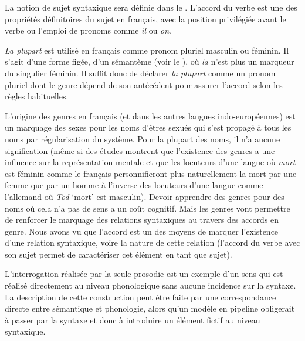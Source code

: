 {     La notion de sujet syntaxique sera définie dans le . L’accord du verbe est une des propriétés définitoires du sujet en français, avec la position privilégiée avant le verbe ou l’emploi de pronoms comme \textit{il} ou \textit{on}.

     \textit{La plupart} est utilisé en français comme pronom pluriel masculin ou féminin. Il s’agit d’une forme figée, d’un sémantème (voir le ), où \textit{la} n’est plus un marqueur du singulier féminin. Il suffit donc de déclarer \textit{la plupart} comme un pronom pluriel dont le genre dépend de son antécédent pour assurer l’accord selon les règles habituelles.

     L’origine des genres en français (et dans les autres langues indo-européennes) est un marquage des sexes pour les noms d’êtres sexués qui s’est propagé à tous les noms par régularisation du système. Pour la plupart des noms, il n’a aucune signification (même si des études montrent que l’existence des genres a une influence sur la représentation mentale et que les locuteurs d’une langue où \textit{mort} est féminin comme le français personnifieront plus naturellement la mort par une femme que par un homme à l’inverse des locuteurs d’une langue comme l’allemand où \textit{Tod} ‘mort’ est masculin). Devoir apprendre des genres pour des noms où cela n’a pas de sens a un coût cognitif. Mais les genres vont permettre de renforcer le marquage des relations syntaxiques au travers des accords en genre. Nous avons vu que l’accord est un des moyens de marquer l’existence d’une relation syntaxique, voire la nature de cette relation (l’accord du verbe avec son sujet permet de caractériser cet élément en tant que sujet).

     L’interrogation réalisée par la seule prosodie est un exemple d’un sens qui est réalisé directement au niveau phonologique sans aucune incidence sur la syntaxe. La description de cette construction peut être faite par une correspondance directe entre sémantique et phonologie, alors qu’un modèle en pipeline obligerait à passer par la syntaxe et donc à introduire un élément fictif au niveau syntaxique.
}
